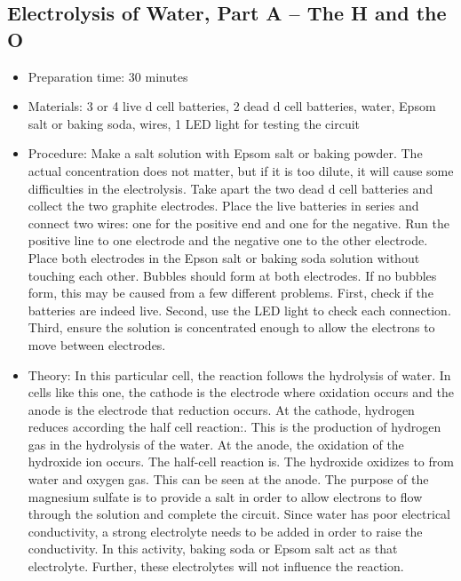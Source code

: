 \subsection{Electrolysis of Water, Part A – The H and the O}
\begin{itemize}
\item{Preparation time: 30 minutes}
\item{Materials: 3 or 4 live d cell batteries, 2 dead d cell batteries, water, Epsom salt or baking soda, wires, 1 LED light for testing the circuit}
\item{Procedure: Make a salt solution with Epsom salt or baking powder. The actual concentration does not matter, but if it is too dilute, it will cause some difficulties in the electrolysis. Take apart the two dead d cell batteries and collect the two graphite electrodes. Place the live batteries in series and connect two wires: one for the positive end and one for the negative. Run the positive line to one electrode and the negative one to the other electrode. Place both electrodes in the Epson salt or baking soda solution without touching each other. Bubbles should form at both electrodes. If no bubbles form, this may be caused from a few different problems. First, check if the batteries are indeed live. Second, use the LED light to check each connection. Third, ensure the solution is concentrated enough to allow the electrons to move between electrodes. }
\item{Theory: In this particular cell, the reaction follows the hydrolysis of water. In cells like this one, the cathode is the electrode where oxidation occurs and the anode is the electrode that reduction occurs. At the cathode, hydrogen reduces according the half cell reaction:. This is the production of hydrogen gas in the hydrolysis of the water. At the anode, the oxidation of the hydroxide ion occurs. The half-cell reaction is. The hydroxide oxidizes to from water and oxygen gas. This can be seen at the anode. The purpose of the magnesium sulfate is to provide a salt in order to allow electrons to flow through the solution and complete the circuit. Since water has poor electrical conductivity, a strong electrolyte needs to be added in order to raise the conductivity. In this activity, baking soda or Epsom salt act as that electrolyte. Further, these electrolytes will not influence the reaction.}
\end{itemize}

